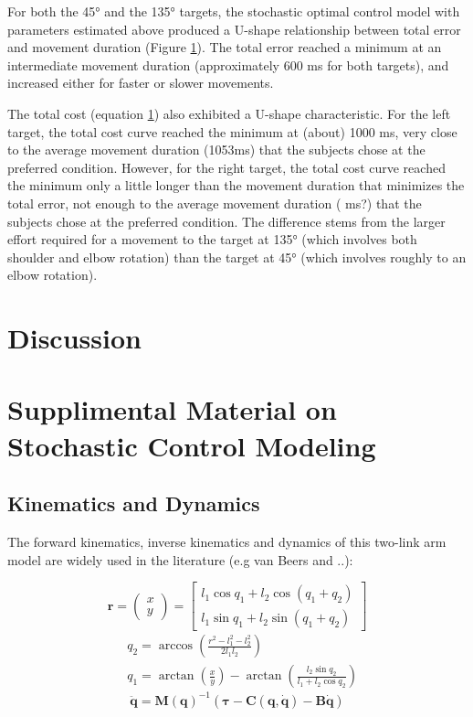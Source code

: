 For both the \ang{45} and the \ang{135} targets, the stochastic optimal control model with parameters estimated above produced a U-shape relationship between total error and movement duration (Figure \ref{}). The total error reached a minimum at an intermediate movement duration (approximately 600 ms for both targets), and increased either for faster or slower movements. 

The total cost (equation \ref{}) also exhibited a U-shape characteristic. 
For the left target, the total cost curve reached the minimum at (about) 1000 ms, very close to the average movement duration (1053ms)  that the subjects chose at the preferred condition. 
However, for the right target, the total cost curve reached the minimum only a little longer than the movement duration that minimizes the total error, not enough to the average movement duration ( ms?) that the subjects chose at the preferred condition.
The difference stems from the larger effort required for a movement to the target at \ang{135} (which involves both shoulder and elbow rotation) than the target at \ang{45} (which involves roughly to an elbow rotation).

\section{Discussion}

\section{Supplimental Material on Stochastic Control Modeling}
\label{app:oc}

\subsection{Kinematics and Dynamics}
\label{app:kindyn}
The forward kinematics, inverse kinematics and dynamics of this two-link arm model are widely used in the literature (e.g van Beers and ..):

\begin{equation}
\bm{r} =\left(\begin{matrix} x\\y \end{matrix}\right) %
= \left[ \begin{matrix}  l_1\cos{q_1} + l_2\cos{(q_1+q_2)} \\ l_1\sin{q_1} + l_2\sin{(q_1+q_2)}  \end{matrix} \right]
\end{equation}
\begin{equation}
\begin{split}
& q_2 = \arccos{\left(\frac{r^2-l_1^2-l_2^2}{2l_1l_2}\right)} \\
& q_1 = \arctan{\left( \frac{x}{y} \right)} - \arctan{\left(\frac{l_2\sin{q_2}}{l_1+l_2\cos q_2 }\right)}
\end{split}
\end{equation}
\begin{equation} \label{dynamics}
\ddot{\bm{q}} = \bm{M}(\bm{q})^{-1} (\bm{\tau} - \bm{C}(\bm{q}, \dot{\bm{q}}) - \bm{B}\dot{\bm{q}})
\end{equation}

